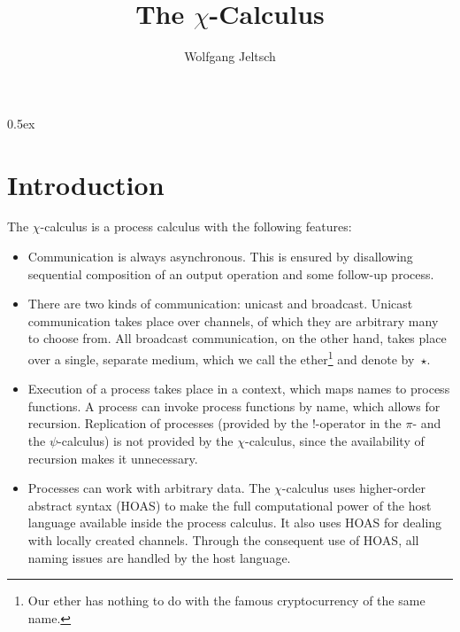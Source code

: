 \documentclass[a4paper,11pt]{article}
\begin{document}
\title{The $\chi$-Calculus}
\author{Wolfgang Jeltsch}

\maketitle

\tableofcontents

\parindent 0pt\parskip 0.5ex

\section{Introduction}

The $\chi$-calculus is a process calculus with the following features:
\begin{itemize}

\item

Communication is always asynchronous. This is ensured by disallowing sequential composition of an
output operation and some follow-up process.

\item

There are two kinds of communication: unicast and broadcast. Unicast communication takes place over
channels, of which they are arbitrary many to choose from. All broadcast communication, on the other
hand, takes place over a single, separate medium, which we call the ether\footnote{Our ether has
nothing to do with the famous cryptocurrency of the same name.} and denote by~$\star$.

\item

Execution of a process takes place in a context, which maps names to process functions. A process
can invoke process functions by name, which allows for recursion. Replication of processes (provided
by the $!$-operator in the $\pi$- and the $\psi$-calculus) is not provided by the $\chi$-calculus,
since the availability of recursion makes it unnecessary.

\item

Processes can work with arbitrary data. The $\chi$-calculus uses higher-order abstract syntax (HOAS)
to make the full computational power of the host language available inside the process calculus. It
also uses HOAS for dealing with locally created channels. Through the consequent use of HOAS, all
naming issues are handled by the host language.

\end{itemize}


\end{document}
